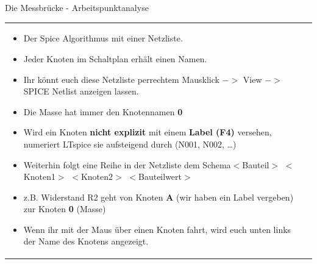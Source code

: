 \begin{frame}[t]{Die Messbrücke - Arbeitspunktanalyse}
\begin{spacing}{0.9}
\begin{tiny}
\begin{table}[h!]
\begin{tabular}{p{3cm} p{7cm}}
\begin{minipage}{.7\textwidth}
            \begin{itemize}
              \item Der Spice Algorithmus mit einer Netzliste.
              \item Jeder Knoten im Schaltplan erhält einen Namen.
              \item Ihr könnt euch diese Netzliste per\newline rechtem Mausklick $->$ View $->$ SPICE Netlist anzeigen lassen.
              \item Die Masse hat immer den Knotennamen \textbf{0}
              \item Wird ein Knoten \textbf{nicht explizit} mit einem \textbf{Label (F4)} versehen, numeriert LTspice sie aufsteigend durch (N001, N002, \dots)
              \item Weiterhin folgt eine Reihe in der Netzliste dem Schema\newline $<$Bauteil$>$ $<$Knoten1$>$ $<$Knoten2$>$ $<$Bauteilwert$>$
              \item z.B. Widerstand R2 geht von Knoten \textbf{A} (wir haben ein Label vergeben) zur Knoten \textbf{0} (Masse)
              \item Wenn ihr mit der Maus über einen Knoten fahrt, wird euch unten links der Name des Knotens angezeigt.
            \end{itemize}
          \end{minipage}
          \\
        \end{tabular}
      \end{table}
    \end{tiny} \end{spacing}


\end{frame}

